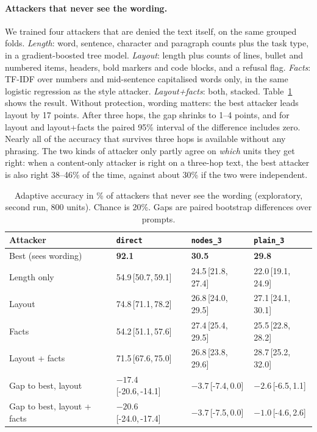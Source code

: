 \documentclass[11pt]{article}
\newcommand{\cond}[1]{\texttt{#1}}
\newcommand{\ci}[2]{\,[#1,\,#2]}
\begin{document}
\paragraph{Attackers that never see the wording.} We trained four attackers that are denied the text itself, on the same grouped folds. \emph{Length}: word, sentence, character and paragraph counts plus the task type, in a gradient-boosted tree model. \emph{Layout}: length plus counts of lines, bullet and numbered items, headers, bold markers and code blocks, and a refusal flag. \emph{Facts}: TF-IDF over numbers and mid-sentence capitalised words only, in the same logistic regression as the style attacker. \emph{Layout+facts}: both, stacked. Table~\ref{tab:content} shows the result. Without protection, wording matters: the best attacker leads layout by 17 points. After three hops, the gap shrinks to 1--4 points, and for layout and layout+facts the paired 95\% interval of the difference includes zero. Nearly all of the accuracy that survives three hops is available without any phrasing. The two kinds of attacker only partly agree on \emph{which} units they get right: when a content-only attacker is right on a three-hop text, the best attacker is also right 38--46\% of the time, against about 30\% if the two were independent.

\begin{table}[t]
\centering
\small
\begin{tabular}{@{}l lll@{}}
\toprule
Attacker & \cond{direct} & \cond{nodes\_3} & \cond{plain\_3} \\
\midrule
Best (sees wording) & \textbf{92.1} & \textbf{30.5} & \textbf{29.8} \\
Length only & 54.9\ci{50.7}{59.1} & 24.5\ci{21.8}{27.4} & 22.0\ci{19.1}{24.9} \\
Layout & 74.8\ci{71.1}{78.2} & 26.8\ci{24.0}{29.5} & 27.1\ci{24.1}{30.1} \\
Facts & 54.2\ci{51.1}{57.6} & 27.4\ci{25.4}{29.5} & 25.5\ci{22.8}{28.2} \\
Layout + facts & 71.5\ci{67.6}{75.0} & 26.8\ci{23.8}{29.6} & 28.7\ci{25.2}{32.0} \\
\midrule
Gap to best, layout & $-17.4$\ci{-20.6}{-14.1} & $-3.7$\ci{-7.4}{0.0} & $-2.6$\ci{-6.5}{1.1} \\
Gap to best, layout + facts & $-20.6$\ci{-24.0}{-17.4} & $-3.7$\ci{-7.5}{0.0} & $-1.0$\ci{-4.6}{2.6} \\
\bottomrule
\end{tabular}
\caption{Adaptive accuracy in \% of attackers that never see the wording (exploratory, second run, 800 units). Chance is 20\%. Gaps are paired bootstrap differences over prompts.}
\label{tab:content}
\end{table}
\end{document}
